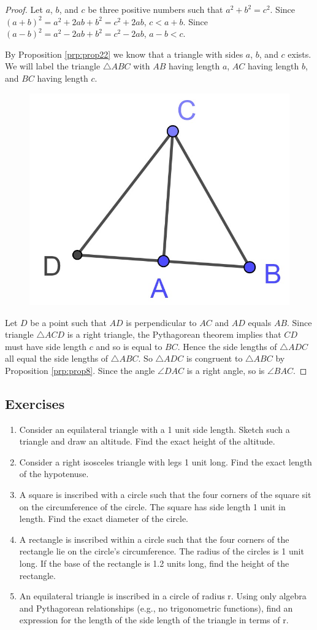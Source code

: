 \documentclass[
]{book}
\theoremstyle{definition}
\theoremstyle{definition}
\theoremstyle{definition}
\theoremstyle{definition}
\theoremstyle{remark}
\begin{document}
\begin{proof}
Let \(a\), \(b\), and \(c\) be three positive numbers such that \(a^2+b^2=c^2\). Since \((a+b)^2 = a^2+2ab+b^2 = c^2 + 2ab\), \(c<a+b\). Since \((a-b)^2 = a^2-2ab+b^2 = c^2-2ab\), \(a-b<c\).

By Proposition \ref{prp:prop22} we know that a triangle with sides \(a\), \(b\), and \(c\) exists. We will label the triangle \(\triangle ABC\) with \(AB\) having length \(a\), \(AC\) having length \(b\), and \(BC\) having length \(c\).

\begin{figure}

{\centering \includegraphics[width=0.2\linewidth]{images/pythagorean2} 

}

\end{figure}

Let \(D\) be a point such that \(AD\) is perpendicular to \(AC\) and \(AD\) equals \(AB\). Since triangle \(\triangle ACD\) is a right triangle, the Pythagorean theorem implies that \(CD\) must have side length \(c\) and so is equal to \(BC\). Hence the side lengths of \(\triangle ADC\) all equal the side lengths of \(\triangle ABC\). So \(\triangle ADC\) is congruent to \(\triangle ABC\) by Proposition \ref{prp:prop8}. Since the angle \(\angle DAC\) is a right angle, so is \(\angle BAC\).
\end{proof}

\hypertarget{exercises-46}{%
\subsection{Exercises}\label{exercises-46}}

\begin{enumerate}
\def\labelenumi{\arabic{enumi}.}
\item
  Consider an equilateral triangle with a 1 unit side length. Sketch such a triangle and draw an altitude. Find the exact height of the altitude.
\item
  Consider a right isosceles triangle with legs 1 unit long. Find the exact length of the hypotenuse.
\item
  A square is inscribed with a circle such that the four corners of the square sit on the circumference of the circle. The square has side length 1 unit in length. Find the exact diameter of the circle.
\item
  A rectangle is inscribed within a circle such that the four corners of the rectangle lie on the circle's circumference. The radius of the circles is 1 unit long. If the base of the rectangle is 1.2 units long, find the height of the rectangle.
\item
  An equilateral triangle is inscribed in a circle of radius r. Using only algebra and Pythagorean relationships (e.g., no trigonometric functions), find an expression for the length of the side length of the triangle in terms of r.
\end{enumerate}
\end{document}

